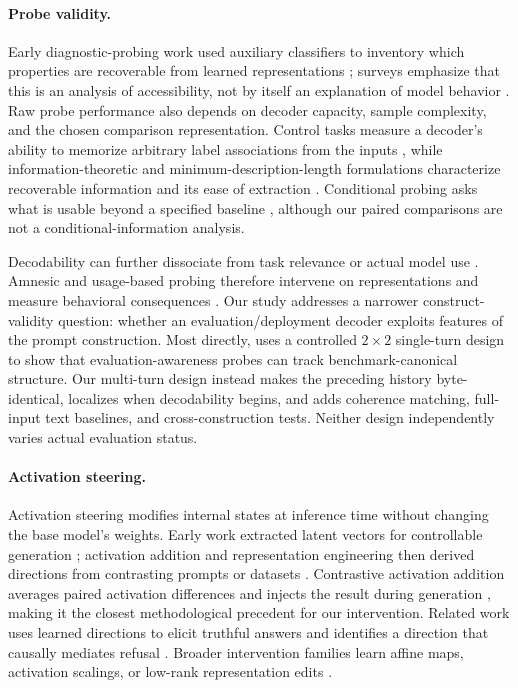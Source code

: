 \documentclass{article}
\begin{document}
\paragraph{Probe validity.}
Early diagnostic-probing work used auxiliary classifiers to inventory which
properties are recoverable from learned representations
\citep{adi2016finegrained,conneau2018cram,giulianelli2018hood}; surveys emphasize
that this is an analysis of accessibility, not by itself an explanation of model
behavior \citep{belinkov2019analysis,belinkov2022probing}. Raw probe performance
also depends on decoder capacity, sample complexity, and the chosen comparison
representation. Control tasks measure a decoder's ability to memorize arbitrary
label associations from the inputs \citep{hewitt2019controls}, while
information-theoretic and minimum-description-length formulations characterize
recoverable information and its ease of extraction
\citep{pimentel2020information,voita2020information}. Conditional probing asks
what is usable beyond a specified baseline \citep{hewitt2021conditional},
although our paired comparisons are not a conditional-information analysis.

Decodability can further dissociate from task relevance or actual model use
\citep{ravichander2021probing}. Amnesic and usage-based probing therefore
intervene on representations and measure behavioral consequences
\citep{elazar2021amnesic,lasri2022usage}. Our study addresses a narrower
construct-validity question: whether an evaluation/deployment decoder exploits
features of the prompt construction. Most directly, \citet{devbunova2026format}
uses a controlled $2\!\times\!2$ single-turn design to show that
evaluation-awareness probes can track benchmark-canonical structure. Our
multi-turn design instead makes the preceding history byte-identical, localizes
when decodability begins, and adds coherence matching, full-input text
baselines, and cross-construction tests. Neither design independently varies
actual evaluation status.

\paragraph{Activation steering.}
Activation steering modifies internal states at inference time without changing
the base model's weights. Early work extracted latent vectors for controllable
generation \citep{subramani2022extracting}; activation addition and
representation engineering then derived directions from contrasting prompts or
datasets \citep{turner2023steering,zou2023representation}. Contrastive
activation addition averages paired activation differences and injects the
result during generation \citep{rimsky2024steering}, making it the closest
methodological precedent for our intervention. Related work uses learned
directions to elicit truthful answers \citep{li2023inference} and identifies a
direction that causally mediates refusal \citep{arditi2024refusal}. Broader
intervention families learn affine maps, activation scalings, or low-rank
representation edits \citep{singh2024representation,stoehr2024activation,
wu2024reft}.
\end{document}
